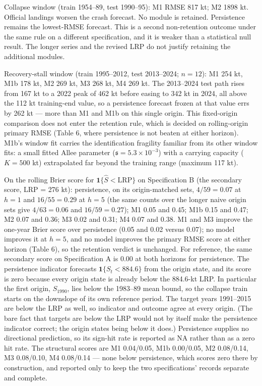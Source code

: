 \documentclass[11pt]{article}
\begin{document}
Collapse window (train 1954--89, test 1990--95): M1 RMSE 817 kt; M2 1898
kt. Official landings worsen the crash forecast. No module is retained.
Persistence remains the lowest-RMSE forecast. This is a second non-retention outcome under the same rule on a
different specification, and it is weaker than a statistical null
result. The longer series and the revised LRP
do not justify retaining the additional modules.

Recovery-stall window (train 1995--2012, test 2013--2024; \(n=12\)): M1
254 kt, M1b 178 kt, M2 269 kt, M3 268 kt, M4 269 kt. The 2013--2024 test
path rises from 167 kt to a 2022 peak of 462 kt before easing to 342 kt
in 2024, all above the 112 kt training-end value,
so a persistence forecast frozen at that value errs by 262 kt --- more
than M1 and M1b on this single origin. This fixed-origin comparison does
not enter the retention rule, which is decided on rolling-origin primary
RMSE (Table 6, where persistence is not beaten at either horizon). M1b's
window fit carries the identification fragility familiar from its other
window fits: a small fitted Allee parameter
(\(\mathfrak s = 5.3\times10^{-3}\)) with a carrying capacity (\(K=500\)
kt) extrapolated far beyond the training range (maximum 117 kt).

On the rolling Brier score for \(\mathbf{1}\{\hat S<\mathrm{LRP}\}\) on
Specification B (the secondary score, LRP = 276 kt):
persistence, on its origin-matched sets, \(4/59 = 0.07\) at \(h{=}1\)
and \(16/55 = 0.29\) at \(h{=}5\) (the same counts over the longer naive
origin sets give \(4/63 = 0.06\) and \(16/59 = 0.27\)); M1 0.05 and 0.45;
M1b 0.15 and 0.47; M2 0.07 and 0.36; M3 0.02 and 0.31; M4 0.07 and 0.38.
M1 and M3 improve the one-year Brier score over persistence (0.05 and
0.02 versus 0.07); no model improves it at \(h{=}5\), and no model
improves the primary RMSE score at either horizon (Table 6), so the
retention verdict is unchanged. For reference, the same secondary score on Specification A is 0.00 at
both horizons for persistence. The persistence indicator forecasts
\(\mathbf{1}\{S_t<884.6\}\) from the origin state, and its score is zero
because every origin state is already below the 884.6-kt LRP. In
particular the first origin, \(S_{1990}\), lies below the 1983--89 mean
bound, so the collapse train starts on the downslope of its own
reference period. The target years 1991--2015 are below the LRP as well,
so indicator and outcome agree at every origin. (The bare fact that targets are below the LRP
would not by itself make the persistence indicator correct; the origin
states being below it does.) Persistence supplies no directional prediction, so its sign-hit rate
is reported as NA rather than as a zero hit rate. The structural
scores are M1 0.04/0.05, M1b
0.00/0.05, M2 0.08/0.14, M3 0.08/0.10, M4 0.08/0.14 --- none below
persistence, which scores zero there by construction, and reported only to keep the two specifications' records
separate and complete.
\end{document}

